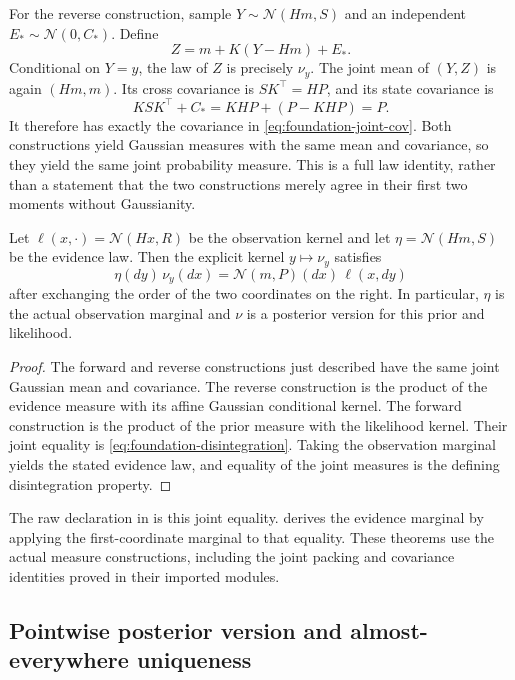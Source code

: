 For the reverse construction, sample $Y\sim\mathcal N(Hm,S)$ and an independent $E_*\sim\mathcal N(0,C_*)$. Define
\[
 Z=m+K(Y-Hm)+E_*.
\]
Conditional on $Y=y$, the law of $Z$ is precisely $\nu_y$. The joint mean of $(Y,Z)$ is again $(Hm,m)$. Its cross covariance is $SK^\top=HP$, and its state covariance is
\[
 KSK^\top+C_*=KHP+(P-KHP)=P.
\]
It therefore has exactly the covariance in \eqref{eq:foundation-joint-cov}. Both constructions yield Gaussian measures with the same mean and covariance, so they yield the same joint probability measure. This is a full law identity, rather than a statement that the two constructions merely agree in their first two moments without Gaussianity.

\begin{theorem}
\label{thm:foundation-disintegration}
Let $\ell(x,\cdot)=\mathcal N(Hx,R)$ be the observation kernel and let $\eta=\mathcal N(Hm,S)$ be the evidence law. Then the explicit kernel $y\mapsto\nu_y$ satisfies
\begin{equation}
 \eta(dy)\,\nu_y(dx)
   =\mathcal N(m,P)(dx)\,\ell(x,dy)
 \label{eq:foundation-disintegration}
\end{equation}
after exchanging the order of the two coordinates on the right. In particular, $\eta$ is the actual observation marginal and $\nu$ is a posterior version for this prior and likelihood.
\end{theorem}
\begin{proof}
The forward and reverse constructions just described have the same joint Gaussian mean and covariance. The reverse construction is the product of the evidence measure with its affine Gaussian conditional kernel. The forward construction is the product of the prior measure with the likelihood kernel. Their joint equality is \eqref{eq:foundation-disintegration}. Taking the observation marginal yields the stated evidence law, and equality of the joint measures is the defining disintegration property.
\end{proof}

The raw declaration  in  is this joint equality.  derives the evidence marginal by applying the first-coordinate marginal to that equality. These theorems use the actual measure constructions, including the joint packing and covariance identities proved in their imported modules.

\subsection{Pointwise posterior version and almost-everywhere uniqueness}

